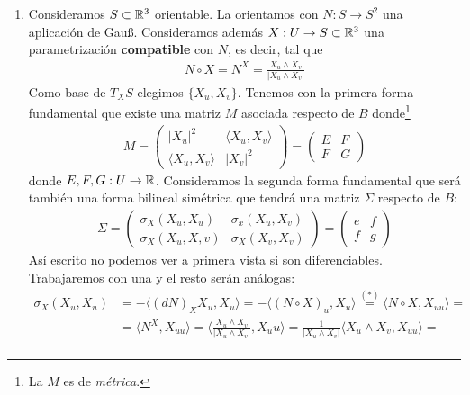 \begin{ejercicio}
\begin{enumerate}
        \item Consideramos $S\subset \mathbb{R}^3$ orientable. La orientamos con $N:S\to S^2$ una aplicación de Gau\ss. Consideramos además $X:U\to S\subset \mathbb{R}^3$ una parametrización \textbf{compatible} con $N$, es decir, tal que 
        \begin{gather*}
            N \circ X = N^X = \frac{X_u \wedge X_v}{|X_u \wedge X_v|}
        \end{gather*}
        Como base de $T_XS$ elegimos $\{X_u, X_v \}$. Tenemos con la primera forma fundamental que existe una matriz $M$ asociada respecto de $B$ donde\footnote{La $M$ es de \textit{métrica}.} 
        \begin{gather*}
            M = \begin{pmatrix}
                |X_u|^2 & \langle X_u, X_v \rangle \\
                \langle X_u, X_v \rangle & |X_v|^2
            \end{pmatrix} = \begin{pmatrix}
                E & F\\
                F & G
            \end{pmatrix}
        \end{gather*}
        donde $E,F,G : U \to \mathbb{R}$. Consideramos la segunda forma fundamental que será también una forma bilineal simétrica que tendrá una matriz $\Sigma$ respecto de $B$:
        \begin{gather*}
            \Sigma = \begin{pmatrix}
                \sigma_X(X_u, X_u) & \sigma_x(X_u, X_v)\\
                \sigma_X(X_u, X,v) & \sigma_X(X_v, X_v)
            \end{pmatrix} = \begin{pmatrix}
                e & f \\
                f & g
            \end{pmatrix}
        \end{gather*}
        Así escrito no podemos ver a primera vista si son diferenciables. Trabajaremos con una y el resto serán análogas:
        \begin{align*}
            \sigma_X(X_u, X_u) &= - \langle (dN)_X X_u, X_u \rangle = - \langle (N \circ X)_u, X_u \rangle \overset{(\ast)}{=} \langle N\circ X, X_{uu} \rangle =\\
            &= \langle N^X, X_{uu} \rangle = \langle \frac{X_u \wedge X_v}{|X_u \wedge X_v|}, X_uu \rangle = \frac{1}{|X_u \wedge X_v|} \langle X_u \wedge X_v, X_{uu} \rangle =\\

\end{align*}
\end{enumerate}
\end{ejercicio}
